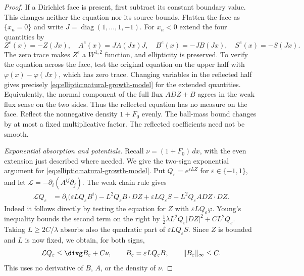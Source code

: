 \begin{proof}
If a Dirichlet face is present, first subtract its constant boundary
value.  This changes neither the equation nor its source bounds.
Flatten the face as
$\{x_n=0\}$ and write $J=\operatorname{diag}(1,\ldots,1,-1)$.
For $x_n<0$ extend the four quantities by
\begin{equation}\label{eq:elliptic:ng-reflection}
 Z^e(x)=-Z(Jx),\quad A^e(x)=JA(Jx)J,\quad
 B^e(x)=-JB(Jx),\quad S^e(x)=-S(Jx).
\end{equation}
The zero trace makes $Z^e$ a $W^{1,2}$ function, and ellipticity is
preserved.  To verify the equation across the face, test the original
equation on the upper half with $\varphi(x)-\varphi(Jx)$, which has
zero trace.  Changing variables in the reflected half gives precisely
\eqref{eq:elliptic:natural-growth-model} for the extended quantities.  Equivalently,
the normal component of the full flux $ADZ+B$ agrees in the weak flux sense on the two sides.
Thus the reflected equation has no measure on the face.  Reflect the
nonnegative density $1+F_0$ evenly.  The ball-mass bound
changes by at most a fixed multiplicative factor.  The reflected
coefficients need not be smooth.

\medskip\noindent\emph{Exponential absorption and potentials.}
Recall $\nu=(1+F_0)\,dx$, with the even extension just described where
needed.  We give the two-sign exponential argument for
\eqref{eq:elliptic:natural-growth-model}.  Put
$Q_\varepsilon=e^{\varepsilon LZ}$ for $\varepsilon\in\{-1,1\}$,
and let $\mathcal L=-\partial_i(A^{ij}\partial_j)$.
The weak chain rule gives
\begin{align}
 \mathcal L Q_\varepsilon
 &=\partial_i\bigl(\varepsilon LQ_\varepsilon B^i\bigr)
   -L^2Q_\varepsilon B\cdot DZ
   +\varepsilon LQ_\varepsilon S
   -L^2Q_\varepsilon A DZ\cdot DZ.\label{eq:elliptic:ng-exp-identity}
\end{align}
Indeed it follows directly by testing the equation for $Z$ with
$\varepsilon LQ_\varepsilon\varphi$.  Young's inequality bounds the
second term on the right by
$\tfrac12\lambda L^2Q_\varepsilon|DZ|^2+C L^2Q_\varepsilon$.
Taking $L\ge 2C/\lambda$ absorbs also the quadratic part of
$\varepsilon LQ_\varepsilon S$.  Since $Z$ is bounded and $L$ is
now fixed, we obtain, for both signs,
\begin{equation}\label{eq:elliptic:ng-exp-inequality}
 \mathcal L Q_\varepsilon
       \le \divg B_\varepsilon+C\nu,
 \qquad B_\varepsilon=\varepsilon LQ_\varepsilon B,
 \qquad \|B_\varepsilon\|_\infty\le C.
\end{equation}
This uses no derivative of $B$, $A$, or the density of $\nu$.


\end{proof}
